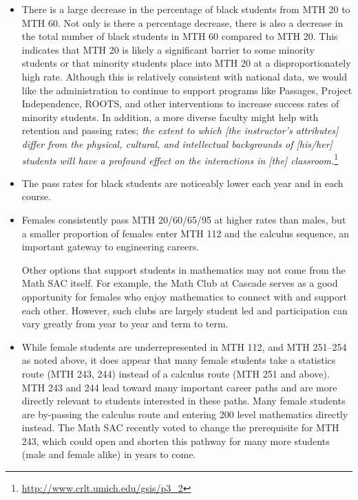 \begin{itemize}
	\item There is a large decrease in the percentage of black students from MTH 20 to MTH 60.
	      Not only is there a percentage decrease, there is also a decrease in the total number of black students in MTH 60 compared to MTH 20.
	      This indicates that MTH 20 is likely a significant barrier to some minority students or that minority students place into MTH 20 at a disproportionately high rate.
	      Although this is relatively consistent with national data, we would like the administration to continue to support programs like Passages, Project Independence, ROOTS, and other interventions to increase success rates of minority students.
	      In addition, a more diverse faculty might help with retention and passing rates; \emph{ the extent to which [the instructor's attributes] differ from the physical, cultural, and intellectual backgrounds of [his/her] students will have a profound effect on the interactions in [the] classroom.}\footnote{\url{http://www.crlt.umich.edu/gsis/p3_2}}
	\item The pass rates for black students are noticeably lower each year and in each course.

	\item Females consistently pass MTH 20/60/65/95 at higher rates than males, but a smaller proportion of females enter MTH 112 and the calculus sequence, an important gateway to engineering careers.


	      Other options that support students in mathematics may not come from the Math SAC itself.
	      For example, the Math Club at Cascade serves as a good opportunity for females who enjoy mathematics to connect with and support each other.
	      However, such clubs are largely student led and participation can vary greatly from year to year and term to term.

	\item While female students are underrepresented in MTH 112, and MTH 251--254 as noted above, it does appear that many female students take a statistics route (MTH 243, 244) instead of a calculus route (MTH 251 and above).
	      MTH 243 and 244 lead toward many important career paths and are more directly relevant to students interested in these paths.
	      Many female students are by-passing the calculus route and entering 200 level mathematics directly instead.
	      The Math SAC recently voted to change the prerequisite for MTH 243, which could open and shorten this pathway for many more students (male and female alike) in years to come.


\end{itemize}
